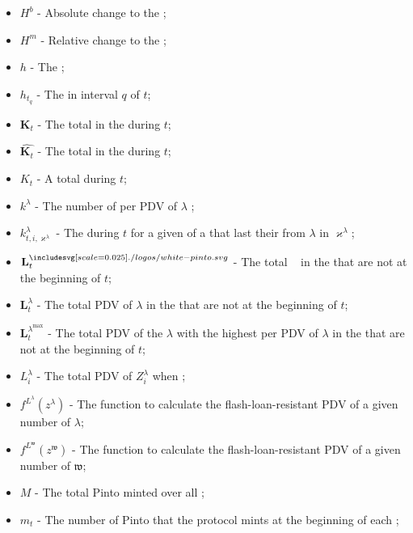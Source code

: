 \documentclass[class=article, crop=false]{standalone}
\begin{document}
\begin{itemize}[topsep=0pt, itemsep=3pt,leftmargin=16pt]
    \item[] $H^{b}$ - Absolute change to the ;
    \item[] $H^{m}$ - Relative change to the ;
    \item[] $h$ - The ;
    \item[] $h_{t_{q}}$ - The  in interval $q$ of $t$;
    \item[] $\mathbf{K}_{t}$ - The total  in the  during $t$;
    \item[] $\widehat{\mathbf{K}_{t}}$ - The total  in the  during $t$;
    \item[] $K_{t}$ - A  total  during $t$;
    \item[] $k^{\lambda}$ - The number of  per PDV of $\lambda$ ;
    \item[] $k_{t,i,\varkappa^{\lambda}}^{\lambda}$ - The  during $t$ for a given  of a  that last  their  from $\lambda$  in $\varkappa^{\lambda}$;
    \item[] $\mathbf{L}_{t}^{\pinto}$ - The total \Pinto\  in the  that are not  at the beginning of $t$;
    \item[] $\mathbf{L}_{t}^{\lambda}$ - The total PDV of $\lambda$  in the  that are not  at the beginning of $t$;
    \item[] $\mathbf{L}_{t}^{\lambda^{\text{max}}}$ - The total PDV of the $\lambda$ with the highest  per PDV of $\lambda$  in the  that are not  at the beginning of $t$;
    \item[] $L_{i}^{\lambda}$ - The total PDV of $Z_{i}^{\lambda}$ when ;
    \item[] $f^{L^{\lambda}}(z^{\lambda})$ - The function to calculate the flash-loan-resistant PDV of a given number of  $\lambda$;
    \item[] $f^{L^{\mathfrak{w}}}(z^{\mathfrak{w}})$ - The function to calculate the flash-loan-resistant PDV of a given number of  $\mathfrak{w}$;
    \item[] $M$ - The total Pinto minted over all ;
    \item[] $m_{t}$ - The number of Pinto that the protocol mints at the beginning of each ;

\end{itemize}
\end{document}
